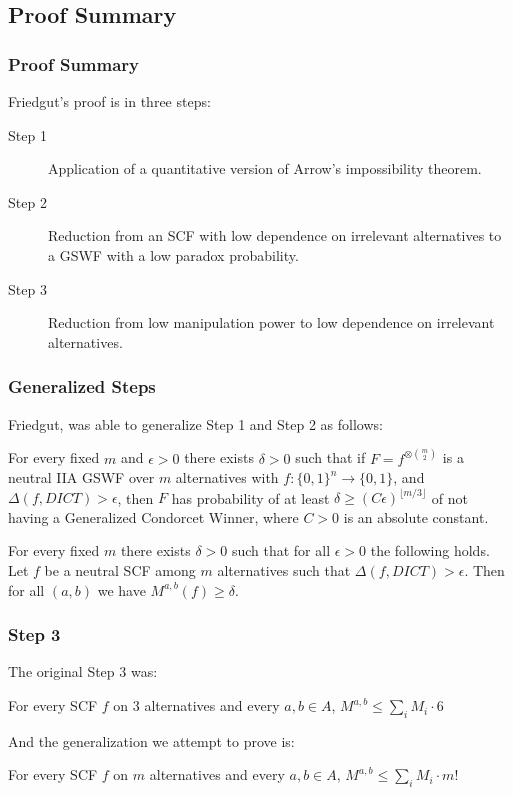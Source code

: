 \documentclass[aspectratio=169]{beamer}
\begin{document}
	\subsection{Proof Summary}

		\begin{frame}
			\frametitle{Proof Summary}

			Friedgut's proof is in three steps:

			\begin{description}
				\item[Step 1] Application of a quantitative version of Arrow's impossibility theorem.
				\item[Step 2] Reduction from an SCF with low dependence on irrelevant alternatives to a GSWF with a low paradox probability.
				\item[Step 3] Reduction from low manipulation power to low dependence on irrelevant alternatives.
			\end{description}
		\end{frame}

		\begin{frame}
			\frametitle{Generalized Steps}

			Friedgut, was able to generalize Step 1 and Step 2 as follows:

			\begin{lemma}
				For every fixed $m$ and $\epsilon > 0$ there exists $\delta > 0$ such that if $F = f^{\otimes \binom{m}{2}}$ is a neutral IIA GSWF over $m$ alternatives with $f : \{0,1\}^n \rightarrow \{0,1\}$, and $\Delta(f, DICT) > \epsilon$, then $F$ has probability of at least $\delta \ge (C\epsilon)^{\lfloor m/3 \rfloor}$ of not having a Generalized Condorcet Winner, where $C > 0$ is an absolute constant.
			\end{lemma}

			\begin{lemma}
				For every fixed $m$ there exists $\delta > 0$ such that for all $\epsilon > 0$ the following holds. Let $f$ be a neutral SCF among $m$ alternatives such that $\Delta(f, DICT) > \epsilon$. Then for all $(a,b)$ we have $M^{a,b}(f) \ge \delta$.
			\end{lemma}

		\end{frame}

		\begin{frame}
			\frametitle{Step 3}

			The original Step 3 was:

			\begin{lemma}
				For every SCF $f$ on $3$ alternatives and every $a,b \in A$, $M^{a,b} \le \sum_i M_i \cdot 6$
			\end{lemma}

			And the generalization we attempt to prove is:

			\begin{lemma}
				For every SCF $f$ on $m$ alternatives and every $a,b \in A$, $M^{a,b} \le \sum_i M_i \cdot m!$
			\end{lemma}
		\end{frame}
\end{document}

